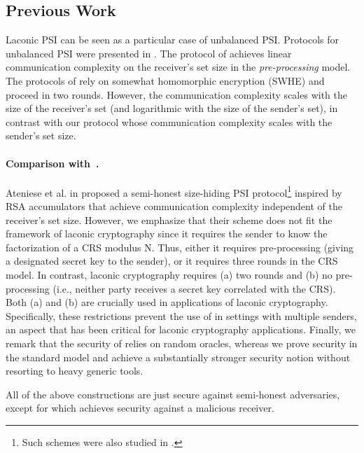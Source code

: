\subsection{Previous Work}
\label{subsec:previouswork}

Laconic PSI can be seen as a particular case of unbalanced PSI. Protocols for unbalanced PSI were presented in \cite{PKC:AteDeCTsu11,FC:ResAra18,CCS:CheLaiRin17,CCS:CHLR18}. The protocol of \cite{FC:ResAra18} achieves linear communication complexity on the receiver's set size in the \emph{pre-processing} model. The protocols of \cite{CCS:CheLaiRin17,CCS:CHLR18} rely on somewhat homomorphic encryption (SWHE) and proceed in two rounds. However, the communication complexity scales with the size of the receiver's set (and logarithmic with the size of the sender's set), in contrast with our protocol whose communication complexity scales with the sender's set size.

\paragraph{Comparison with~\cite{PKC:AteDeCTsu11}.}  Ateniese et al. in \cite{PKC:AteDeCTsu11} proposed a semi-honest size-hiding PSI protocol\footnote{Such schemes were also studied in \cite{TCC:IshPas07,AC:LinNisOrl13,ITCS:HubWic15}.} inspired by RSA accumulators that achieve communication complexity independent of the receiver's set size. However, we emphasize that their scheme does not fit the framework of laconic cryptography since it requires the sender to  know the factorization of a CRS modulus N. Thus, either it requires pre-processing (giving a designated secret key to the sender), or it requires three rounds in the CRS model. In contrast, laconic cryptography requires (a)  two rounds and (b) no pre-processing (i.e., neither party receives a secret key correlated with the CRS). Both (a) and (b) are crucially used in applications of laconic cryptography. Specifically, these restrictions prevent the use of \cite{PKC:AteDeCTsu11} in settings with multiple senders, an aspect that has been critical for laconic cryptography applications. Finally, we remark that the security of \cite{PKC:AteDeCTsu11} relies on random oracles, whereas we prove security in the standard model and achieve a substantially stronger security notion without resorting to heavy generic tools. 


All of the above constructions are just secure against semi-honest adversaries, except for \cite{CCS:CHLR18} which achieves security against a malicious receiver.

